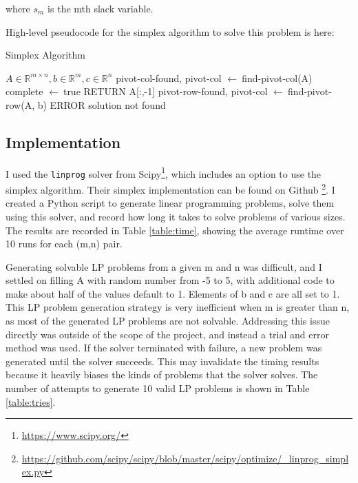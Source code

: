 \documentclass[11pt, a4paper]{article}
\begin{document}
where $s_m$ is the mth slack variable. 

High-level pseudocode for the simplex algorithm to solve this problem is here:

\newcommand{\ass}{$\leftarrow\ $}

\begin{algorithm}
\caption{Simplex Algorithm}
\begin{algorithmic}
    \REQUIRE $A \in \mathbb{R}^{m\times n}, b \in \mathbb{R}^{m}, c \in \mathbb{R}^{n}$
    \STATE {complete \ass false}
        \STATE pivot-col-found, pivot-col \ass find-pivot-col(A)
            \STATE complete \ass true
            \STATE RETURN A[:,-1]
        \ENDIF
        \STATE pivot-row-found, pivot-col \ass find-pivot-row(A, b)
            \STATE ERROR solution not found
        \ENDIF
    \ENDWHILE
\end{algorithmic}
\end{algorithm}


\subsection{Implementation}


I used the \lstinline{linprog} solver from Scipy\footnote{\url{https://www.scipy.org/}}, which
includes an option to use the simplex algorithm. Their simplex implementation can be found on
Github
\footnote{
    \url{https://github.com/scipy/scipy/blob/master/scipy/optimize/\_linprog\_simplex.py}}.
I created a Python script to generate linear programming problems, solve them using this solver, and
record how long it takes to solve problems of various sizes. The results are recorded in Table
\ref{table:time}, showing the average runtime over 10 runs for each (m,n) pair.

Generating solvable LP problems from a given m and n was difficult, and I settled on filling A with
random number from -5 to 5, with additional code to make about half of the values default to 1.
Elements of b and c are all set to 1. This LP problem generation strategy is very inefficient when
m is greater than n, as most of the generated LP problems are not solvable. Addressing this issue
directly was outside of the scope of the project, and instead a trial and error method was used. If
the solver terminated with failure, a new problem was generated until the solver succeeds. This may
invalidate the timing results because it heavily biases the kinds of problems that the solver
solves. The number of attempts to generate 10 valid LP problems is shown in Table \ref{table:tries}.
\end{document}
